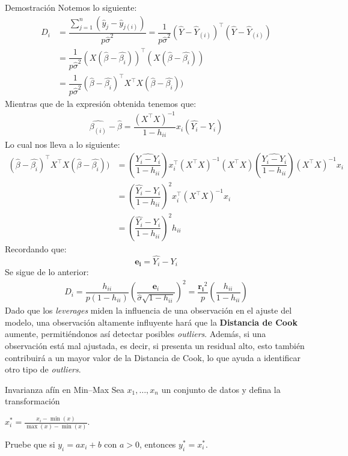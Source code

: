 \documentclass[a4paper,11pt]{article}
\begin{document}
\begin{demostracion}{Demostración}
Notemos lo siguiente:
\begin{align*}
    D_i&=\dfrac{\sum_{j=1}^n(\hat{y}_j-\hat{y}_{j(i)} ) }{p\hat{\sigma}^2}=\dfrac{1}{p\hat{\sigma}^2}(\hat{Y}- \hat{Y}_{(i)} )^\top(\hat{Y}- \hat{Y}_{(i)} )\\
    &=\dfrac{1}{p\hat{\sigma}^2}(X(\hat{\beta}-\hat{\beta_i}))^\top(X(\hat{\beta}-\hat{\beta_i}))\\
      &=\dfrac{1}{p\hat{\sigma}^2}(\hat{\beta}-\hat{\beta_i})^\top X^\top X(\hat{\beta}-\hat{\beta_i}))
\end{align*}
Mientras que de la expresión obtenida tenemos que:
\begin{align*}
    \hat{\beta_{(i)} }-\hat{\beta}=\dfrac{(X^\top X)^{-1} }{1-h_{ii} }x_i(\hat{Y_i}-Y_i)
\end{align*}
Lo cual nos lleva a lo siguiente:
\begin{align*}
    (\hat{\beta}-\hat{\beta_i})^\top X^\top X(\hat{\beta}-\hat{\beta_i}))&=\left(\dfrac{\hat{Y_i-Y_i}}{1-h_{ii} }\right)x_i^\top(X^\top X)^{-1} (X^\top X)\left(\dfrac{\hat{Y_i-Y_i}}{1-h_{ii} }\right)(X^\top X)^{-1}x_i\\
    &=\left(\dfrac{\hat{Y_i}-Y_i}{1-h_{ii} }\right)^2 x_i^\top (X^\top X)^{-1}x_i\\
    &=\left(\dfrac{\hat{Y_i}-Y_i}{1-h_{ii} }\right)^2h_{ii}
\end{align*}
Recordando que:
\[
\mathbf{e_i}=\hat{Y_i}-Y_i
\]
Se sigue de lo anterior:
\begin{align*}
    D_i=\dfrac{h_{ii} }{p(1-h_{ii}) }\left(\dfrac{\mathbf{e}_i}{\hat{\sigma}\sqrt{1-h_{ii}} }\right)^2=\dfrac{\mathbf{r_i}^2}{p}\left(\dfrac{h_{ii} }{1-h_{ii} }\right)
\end{align*}
Dado que los \textit{leverages} miden la influencia de una observación en el ajuste del modelo, una observación altamente influyente hará que la \textbf{Distancia de Cook} aumente, permitiéndonos así detectar posibles \textit{outliers}. Además, si una observación está mal ajustada, es decir, si presenta un residual alto, esto también contribuirá a un mayor valor de la Distancia de Cook, lo que ayuda a identificar otro tipo de \textit{outliers}.
\end{demostracion}
\newpage
\begin{ejercicio}{8}
Invarianza afín en Min--Max
Sea $x_1, \ldots, x_n$ un conjunto de datos y defina la transformación

$x_i^* = \frac{x_i - \min(x)}{\max(x) - \min(x)}$.

Pruebe que si $y_i = ax_i + b$ con $a > 0$, entonces $y_i^* = x_i^*$.
\end{ejercicio}
\end{document}

